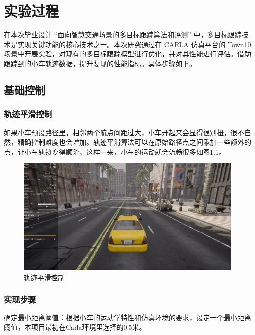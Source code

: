 \chapter{实验过程}

在本次毕业设计 “面向智慧交通场景的多目标跟踪算法和评测” 中，多目标跟踪技术是实现关键功能的核心技术之一。本次研究通过在 CARLA 仿真平台的 Town10 场景中开展实验，对现有的多目标跟踪模型进行优化，并对其性能进行评估。借助跟踪到的小车轨迹数据，提升复现的性能指标。具体步骤如下。

\section{基础控制}
\subsection{轨迹平滑控制}

如果小车预设路径里，相邻两个航点间距过大，小车开起来会显得很别扭，很不自然，精确控制难度也会增加。轨迹平滑算法可以在原始路径点之间添加一些额外的点，让小车轨迹变得顺滑，这样一来，小车的运动就会流畅很多如图\ref{fig:p9}。


\begin{figure}[htbp] %
	\centering
	\includegraphics[width=1\textwidth]{p9} %
	\caption{轨迹平滑控制} %
	\label{fig:p9} %
\end{figure}






\subsection{实现步骤}

确定最小距离阈值：根据小车的运动学特性和仿真环境的要求，设定一个最小距离阈值，本项目最初在Carla环境里选择的0.5米。


